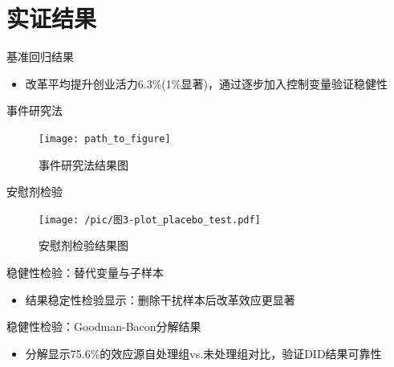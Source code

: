 \documentclass{beamer}
\newcommand{\tightlist}{%
  \setlength{\itemsep}{0pt}\setlength{\parskip}{0pt}}
\begin{document}
\section{实证结果}\label{ux5b9eux8bc1ux7ed3ux679c}

\begin{frame}{基准回归结果}
\label{ux57faux51c6ux56deux5f52ux7ed3ux679c}
\begin{adjustbox}{max width=0.95\textwidth}

\end{adjustbox}

\begin{itemize}
\tightlist
\item
  改革平均提升创业活力6.3\%(1\%显著)，通过逐步加入控制变量验证稳健性
\end{itemize}
\end{frame}

\begin{frame}{事件研究法}
\label{ux4e8bux4ef6ux7814ux7a76ux6cd5}
\begin{figure}
    \centering
    \texttt{[image: path\_to\_figure]} %
    \caption{事件研究法结果图}
\end{figure}
\end{frame}

\begin{frame}{安慰剂检验}
\label{ux5b89ux6170ux5242ux68c0ux9a8c}
\begin{figure}
    \centering
    \texttt{[image: /pic/图3-plot\_placebo\_test.pdf]} 
    \caption{安慰剂检验结果图}
\end{figure}
\end{frame}

\begin{frame}{稳健性检验：替代变量与子样本}
\label{ux7a33ux5065ux6027ux68c0ux9a8cux66ffux4ee3ux53d8ux91cfux4e0eux5b50ux6837ux672c}
\vspace{-2mm}
\begin{adjustbox}{width=0.95\textwidth,center} 

\end{adjustbox}

\begin{itemize}
\tightlist
\item
  结果稳定性检验显示：删除干扰样本后改革效应更显著
\end{itemize}
\end{frame}

\begin{frame}{稳健性检验：Goodman-Bacon分解结果}
\label{ux7a33ux5065ux6027ux68c0ux9a8cgoodman-baconux5206ux89e3ux7ed3ux679c}
\begin{adjustbox}{max totalheight=0.7\textheight} 

\end{adjustbox}

\vspace{-2mm}

\begin{itemize}
\tightlist
\item
  分解显示75.6\%的效应源自处理组vs.未处理组对比，验证DID结果可靠性
\end{itemize}
\end{frame}
\end{document}
